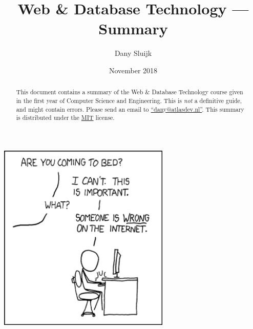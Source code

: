 \documentclass[a4paper,12pt]{article}
\title{Web \& Database Technology --- Summary}
\author{Dany Sluijk}
\date{November 2018}
\begin{document}
\maketitle
\begin{center}
	\includegraphics[height=9cm]{./intro}
\end{center}
\begin{abstract}
	This document contains a summary of the Web \& Database Technology course given
	in the first year of Computer Science and Engineering.
	This is \emph{not} a definitive guide, and might contain errors.
	Please send an email to \href{mailto:dany@atlasdev.nl}{``dany@atlasdev.nl''}.
	This summary is distributed under the
	\href{https://opensource.org/licenses/MIT}{MIT} license.
\end{abstract}

\newpage
\tableofcontents



\end{document}
